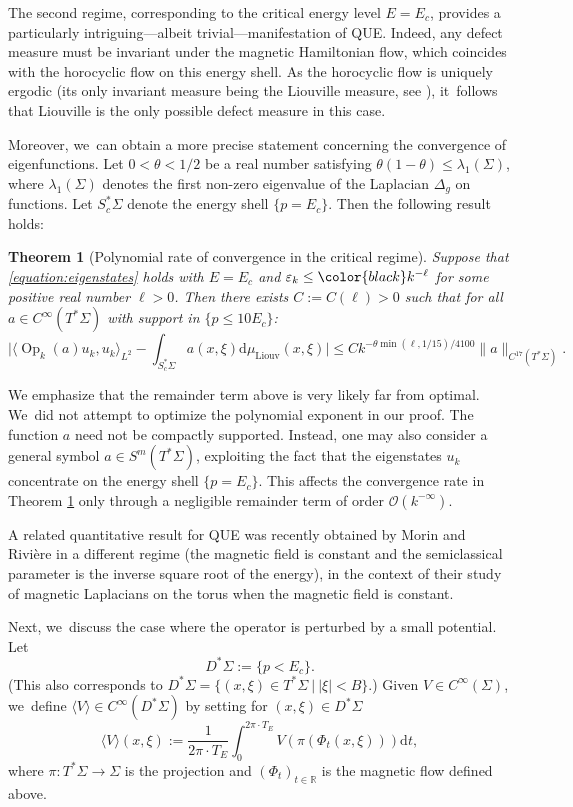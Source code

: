 \documentclass[10pt]{amsart}
\theoremstyle{plain}
\newtheorem{theorem}{Theorem}[section]
\theoremstyle{definition}
\let\mc\mathcal
\newcommand{\R}{\mathbb{R}}
\let\eps\varepsilon
\newcommand{\dd}{\mathrm{d}}
\DeclareMathOperator{\Op}{Op}
\begin{document}
The second regime, corresponding to the critical energy level $E = E_c$, provides a particularly intriguing—albeit trivial—manifestation of QUE. Indeed, any defect measure must be invariant under the magnetic Hamiltonian flow, which coincides with the horocyclic flow on this energy shell. As the horocyclic flow is uniquely ergodic (its only invariant measure being the Liouville measure, see \cite{Furstenberg-73}), it~follows that Liouville is the only possible defect measure in this case.

Moreover, we~can obtain a more precise statement concerning the convergence of eigenfunctions. Let $0 < \theta < 1/2$ be a real number satisfying $\theta(1-\theta) \leq \lambda_1(\Sigma)$, where $\lambda_1(\Sigma)$ denotes the first non-zero eigenvalue of the Laplacian $\Delta_g$ on functions. Let $S^*_c\Sigma$ denote the energy shell $\{p=E_c\}$. Then the following result holds:


\begin{theorem}[Polynomial rate of convergence in the critical regime]
\label{theorem:horocyclic}
Suppose that \eqref{equation:eigenstates} holds with $E=E_c$ and $\eps_k \leq {\color{black}k^{-\ell}}$ for some {\color{black}positive real number} $\ell > 0$. Then there exists $C := C(\ell) > 0$ such that for all $a \in C^\infty(T^*\Sigma)$ with support in $\{p \leq 10E_c\}$:
\[
\biggl|\langle \Op_k(a) u_k,u_k\rangle_{L^2} - \int_{S^*_c\Sigma} a(x,\xi) \dd \mu_{\mathrm{Liouv}}(x,\xi)\biggr| \leq Ck^{-\theta \min(\ell,1/15)/4100}\|a\|_{C^{17}(T^*\Sigma)}.
\]
\end{theorem}


We emphasize that the remainder term above is very likely far from optimal. We~did not attempt to optimize the polynomial exponent in our proof. The function $a$ need not be compactly supported. Instead, one may also consider a general symbol $a \in S^m(T^*\Sigma)$, exploiting the fact that the eigenstates $u_k$ concentrate on the energy shell $\{p=E_c\}$. This affects the convergence rate in Theorem \ref{theorem:horocyclic} only through a negligible remainder term of order $\mc{O}(k^{-\infty})$.

A related quantitative result for QUE was recently obtained by Morin and Rivière \cite{Morin-Riviere-24} in a different regime (the magnetic field is constant and the semiclassical parameter is the inverse square root of the energy), in the context of their study of magnetic Laplacians on the torus when the magnetic field is constant.

Next, we~discuss the case where the operator is perturbed by a small potential. Let
\[
D^*\Sigma := \{p < E_c\}.
\]
(This also corresponds to $D^*\Sigma= \{(x,\xi) \in T^*\Sigma ~|~ |\xi| < B\}$.) Given $V \in C^\infty(\Sigma)$, we~define $\langle V \rangle \in C^\infty(D^*\Sigma)$ by setting for $(x,\xi) \in D^*\Sigma$
\[
\langle V \rangle(x,\xi) := \dfrac{1}{2\pi \cdot T_E} \int_0^{2\pi \cdot T_E} V(\pi(\Phi_t(x,\xi))) \dd t,
\]
where $\pi : T^*\Sigma \to \Sigma$ is the projection and $(\Phi_t)_{t \in \R}$ is the magnetic flow defined above.
\end{document}
